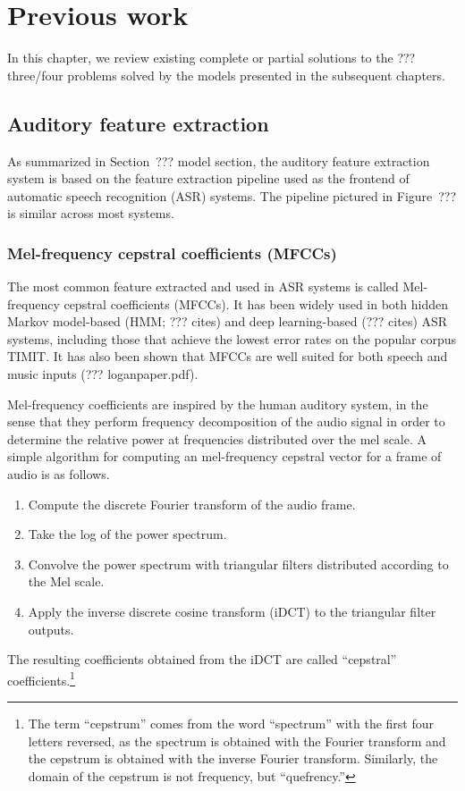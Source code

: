 \chapter{Previous work}

In this chapter, we review
existing complete or partial solutions
to the ???three/four problems
solved by the models
presented in the subsequent chapters.

\section{Auditory feature extraction}

As summarized in Section~??? model section,
the auditory feature extraction system
is based on the feature extraction pipeline
used as the frontend
of automatic speech recognition (ASR) systems.
The pipeline pictured in Figure~???
is similar across most systems.

\subsection{Mel-frequency cepstral coefficients (MFCCs)}

The most common feature extracted
and used in ASR systems
is called Mel-frequency cepstral coefficients (MFCCs).
It has been widely used
in both hidden Markov model-based (HMM; ??? cites)
and deep learning-based
(??? cites) ASR systems,
including those that achieve
the lowest error rates
on the popular corpus TIMIT.
It has also been shown that
MFCCs are well suited
for both speech and music inputs
(??? loganpaper.pdf).

Mel-frequency coefficients are inspired
by the human auditory system,
in the sense that they perform
frequency decomposition
of the audio signal
in order to determine the relative power
at frequencies distributed over the mel scale.
A simple algorithm for computing an
mel-frequency cepstral vector
for a frame of audio is as follows.

\begin{enumerate}
  \item Compute the discrete Fourier transform
    of the audio frame.
  \item Take the log of the power spectrum.
  \item Convolve the power spectrum
    with triangular filters distributed
    according to the Mel scale.
  \item Apply the inverse discrete cosine transform (iDCT)
    to the triangular filter outputs.
\end{enumerate}
The resulting coefficients obtained from
the iDCT are called ``cepstral'' coefficients.\footnote{
  The term ``cepstrum'' comes from
  the word ``spectrum'' with the first four letters reversed,
  as the spectrum is obtained with the Fourier transform
  and the cepstrum is obtained with the inverse Fourier transform.
  Similarly, the domain of the cepstrum is not frequency,
  but ``quefrency.''}

